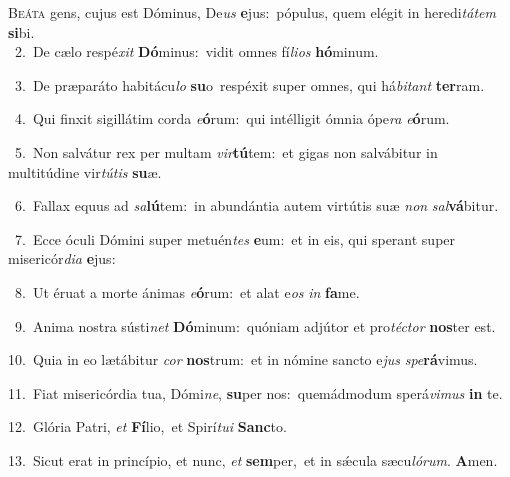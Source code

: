 \lettrine{\initial\textcolor{\initialcolor}{B}}{eáta} gens, cujus est Dóminus, De\textit{us} \textbf{e}\-jus:~\star pópulus, quem elégit in heredi\-\textit{tá}\-\textit{tem} \textbf{si}\-bi.\\
{\numbfont\textcolor{\numbcolor}{~2.}}~De cælo respé\textit{xit} \textbf{Dó}\-minus:~\star vidit omnes fí\-\textit{li}\-\textit{os} \textbf{hó}\-minum.\par
{\numbfont\textcolor{\numbcolor}{~3.}}~De præparáto habitácu\textit{lo} \textbf{su}\-o~\star respéxit super omnes, qui há\-\textit{bi}\-\textit{tant} \textbf{ter}\-ram.\par
{\numbfont\textcolor{\numbcolor}{~4.}}~Qui finxit sigillátim corda \textit{e}\-\textbf{ó}rum:~\star qui intélligit ómnia ópe\textit{ra} \textit{e}\-\textbf{ó}rum.\par
{\numbfont\textcolor{\numbcolor}{~5.}}~Non salvátur rex per multam \textit{vir}\-\textbf{tú}tem:~\star et gigas non salvábitur in multitúdine vir\-\textit{tú}\-\textit{tis} \textbf{su}\-æ.\par
{\numbfont\textcolor{\numbcolor}{~6.}}~Fallax equus ad \textit{sa}\-\textbf{lú}tem:~\star in abundántia autem virtútis suæ \textit{non} \textit{sal}\-\textbf{vá}bitur.\par
{\numbfont\textcolor{\numbcolor}{~7.}}~Ecce óculi Dómini super metuén\textit{tes} \textbf{e}\-um:~\star et in eis, qui sperant super misericór\-\textit{di}\-\textit{a} \textbf{e}\-jus:\par
{\numbfont\textcolor{\numbcolor}{~8.}}~Ut éruat a morte ánimas \textit{e}\-\textbf{ó}rum:~\star et alat e\textit{os} \textit{in} \textbf{fa}\-me.\par
{\numbfont\textcolor{\numbcolor}{~9.}}~Anima nostra sústi\textit{net} \textbf{Dó}\-minum:~\star quóniam adjútor et pro\-\textit{téc}\-\textit{tor} \textbf{nos}\-ter est.\par
{\numbfont\textcolor{\numbcolor}{10.}}~Quia in eo lætábitur \textit{cor} \textbf{nos}\-trum:~\star et in nómine sancto e\textit{jus} \textit{spe}\-\textbf{rá}vimus.\par
{\numbfont\textcolor{\numbcolor}{11.}}~Fiat misericórdia tua, Dómi\-\textit{ne}\-, \textbf{su}\-per nos:~\star quemádmodum sperá\-\textit{vi}\-\textit{mus} \textbf{in} te.\par
{\numbfont\textcolor{\numbcolor}{12.}}~Glória Patri, \textit{et} \textbf{Fí}\-lio,~\star et Spirí\-\textit{tu}\-\textit{i} \textbf{Sanc}\-to.\par
{\numbfont\textcolor{\numbcolor}{13.}}~Sicut erat in princípio, et nunc, \textit{et} \textbf{sem}\-per,~\star et in sǽcula sæcu\-\textit{ló}\-\textit{rum}. \textbf{A}\-men.\par
